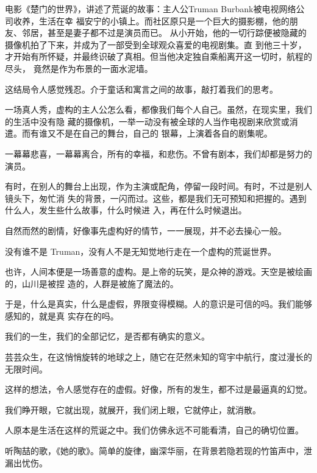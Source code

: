 	\endwriting



		电影《楚门的世界》，讲述了荒诞的故事：主人公Truman Burbank被电视网络公司收养，生活在幸
	福安宁的小镇上。而社区原只是一个巨大的摄影棚，他的朋友、邻居，甚至是妻子都不过是演员而已。
	从小开始，他的一切行踪便被隐藏的摄像机拍了下来，并成为了一部受到全球观众喜爱的电视剧集。直
	到他三十岁，才开始有所怀疑，并最终识破了真相。但当他决定独自乘船离开这一切时，航程的尽头，
	竟然是作为布景的一面水泥墙。

		这结局令人感觉残忍。介于童话和寓言之间的故事，敲打着我们的思考。

		一场真人秀，虚构的主人公怎么看，都像我们每个人自己。虽然，在现实里，我们的生活中没有隐
	藏的摄像机，一举一动没有被全球的人当作电视剧来欣赏或消遣。而有谁又不是在自己的舞台，自己的
	银幕，上演着各自的剧集呢。

		一幕幕悲喜，一幕幕离合，所有的幸福，和悲伤。不曾有剧本，我们却都是努力的演员。

		有时，在别人的舞台上出现，作为主演或配角，停留一段时间。有时，不过是别人镜头下，匆忙消
	失的背景，一闪而过。这些，都是我们无可预知和把握的。遇到什么人，发生些什么故事，什么时候进
	入，再在什么时候退出。

		自然而然的剧情，好像事先虚构好的情节，一一展现，并不必去操心一般。

		没有谁不是 Truman，没有人不是无知觉地行走在一个虚构的荒诞世界。

		也许，人间本便是一场善意的虚构。是上帝的玩笑，是众神的游戏。天空是被绘画的，山川是被捏
	造的，人群是被施了魔法的。

		于是，什么是真实，什么是虚假，界限变得模糊。人的意识是可信的吗。我们能够感知的，就是真
	实存在的吗。

		我们的一生，我们的全部记忆，是否都有确实的意义。\par
		芸芸众生，在这悄悄旋转的地球之上，随它在茫然未知的穹宇中航行，度过漫长的无限时间。\par
		这样的想法，令人感觉存在的虚假。好像，所有的发生，都不过是最逼真的幻觉。\par
		我们睁开眼，它就出现，就展开，我们闭上眼，它就停止，就消散。\par
		人原本是生活在这样的荒诞之中。我们仿佛永远不可能看清，自己的确切位置。

	\endwriting



		听陶喆的歌，《她的歌》。简单的旋律，幽深华丽，在背景若隐若现的竹笛声中，泄漏出忧伤。

